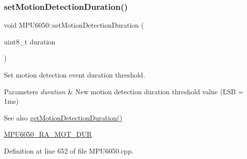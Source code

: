 \begin{DoxyCode}{0}

\end{DoxyCode}
\mbox{\label{classMPU6050_a6d81616aaa47539217057891c91ff08f}} 
\subsubsection{\texorpdfstring{setMotionDetectionDuration()}{setMotionDetectionDuration()}}
{\footnotesize\ttfamily void M\+P\+U6050\+::set\+Motion\+Detection\+Duration (\begin{DoxyParamCaption}\item[{uint8\+\_\+t}]{duration }\end{DoxyParamCaption})}

Set motion detection event duration threshold. 
\begin{DoxyParams}{Parameters}
{\em duration} & New motion detection duration threshold value (L\+SB = 1ms) \\
\hline
\end{DoxyParams}
\begin{DoxySeeAlso}{See also}
\mbox{\hyperlink{classMPU6050_a8ba035c2ae4a05d7e51b0d29e4924fb0}{get\+Motion\+Detection\+Duration()}} 

\mbox{\hyperlink{MPU6050_8h_a25ce9fe346237d22b62881257458fdf4}{M\+P\+U6050\+\_\+\+R\+A\+\_\+\+M\+O\+T\+\_\+\+D\+UR}} 
\end{DoxySeeAlso}


Definition at line 652 of file M\+P\+U6050.\+cpp.


